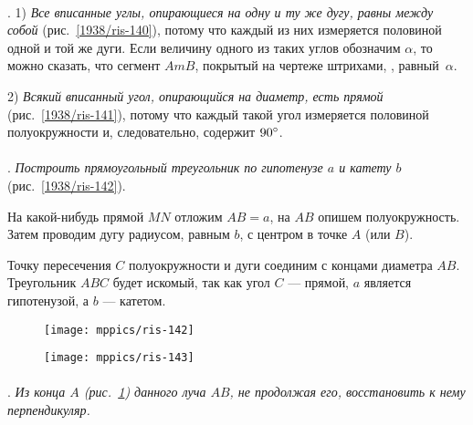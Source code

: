 \paragraph{}\label{1938/125}
. 
1) \emph{Все вписанные углы, опирающиеся на одну и ту же дугу, равны между собой} (рис.~\ref{1938/ris-140}), потому что каждый из них измеряется половиной одной и той же дуги.
Если величину одного из таких углов обозначим $\alpha$, то можно сказать, что сегмент $AmB$, покрытый на чертеже штрихами, , равный~$\alpha$. 

2) \emph{Всякий вписанный угол, опирающийся на диаметр, есть прямой} (рис.~\ref{1938/ris-141}), потому что каждый такой угол измеряется половиной полуокружности и, следовательно, содержит $90\degree$.



\paragraph{}\label{1938/126}
.
\emph{Построить прямоугольный треугольник по гипотенузе $a$ и катету $b$} (рис.~\ref{1938/ris-142}).


На какой-нибудь прямой $MN$ отложим $AB=a$, на $AB$ опишем полуокружность.
Затем проводим дугу радиусом, равным $b$, с центром в точке $A$ (или $B$).

Точку пересечения $C$ полуокружности и дуги соединим с концами диаметра $AB$.
Треугольник $ABC$ будет искомый, так как угол $C$ — прямой, $a$ является гипотенузой, а $b$ — катетом.

\begin{figure}[!ht]
\begin{minipage}{.48\textwidth}
\centering
\texttt{[image: mppics/ris-142]}
\end{minipage}
\hfill
\begin{minipage}{.48\textwidth}
\centering
\texttt{[image: mppics/ris-143]}
\end{minipage}

\medskip

\begin{minipage}{.48\textwidth}
\centering
\caption{}\label{1938/ris-142}
\end{minipage}
\hfill
\begin{minipage}{.48\textwidth}
\centering
\caption{}\label{1938/ris-143}
\end{minipage}
\vskip-4mm
\end{figure}

\paragraph{}\label{1938/127}
.
\emph{Из конца $A$ \emph{(рис.~\ref{1938/ris-143})} данного луча $AB$, не продолжая его, восстановить к нему перпендикуляр.}

